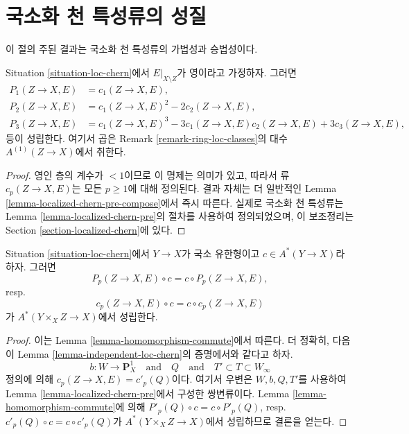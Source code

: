 \section{국소화 천 특성류의 성질}
\label{section-properties-loc-chern}

\noindent
이 절의 주된 결과는 국소화 천 특성류의 가법성과 승법성이다.

\begin{lemma}
\label{lemma-loc-chern-character}
Situation \ref{situation-loc-chern}에서 $E|_{X \setminus Z}$가 영이라고
가정하자. 그러면
\begin{align*}
P_1(Z \to X, E) & = c_1(Z \to X, E), \\
P_2(Z \to X, E) & = c_1(Z \to X, E)^2 - 2c_2(Z \to X, E), \\
P_3(Z \to X, E) & = c_1(Z \to X, E)^3 - 3c_1(Z \to X, E)c_2(Z \to X, E)
+ 3c_3(Z \to X, E),
\end{align*}
등이 성립한다. 여기서 곱은 Remark \ref{remark-ring-loc-classes}의
대수 $A^{(1)}(Z \to X)$에서 취한다.
\end{lemma}

\begin{proof}
영인 층의 계수가 $< 1$이므로 이 명제는 의미가 있고, 따라서
류 $c_p(Z \to X, E)$는 모든 $p \geq 1$에 대해 정의된다.
결과 자체는 더 일반적인 Lemma
\ref{lemma-localized-chern-pre-compose}에서 즉시 따른다. 실제로
국소화 천 특성류는 Lemma \ref{lemma-localized-chern-pre}의 절차를
사용하여 정의되었으며, 이 보조정리는 Section
\ref{section-localized-chern}에 있다.
\end{proof}

\begin{lemma}
\label{lemma-loc-chern-classes-commute}
Situation \ref{situation-loc-chern}에서 $Y \to X$가 국소 유한형이고
$c \in A^*(Y \to X)$라 하자. 그러면
$$
P_p(Z \to X, E) \circ c = c \circ P_p(Z \to X, E),
$$
resp.\
$$
c_p(Z \to X, E) \circ c = c \circ c_p(Z \to X, E)
$$
가 $A^*(Y \times_X Z \to X)$에서 성립한다.
\end{lemma}

\begin{proof}
이는 Lemma \ref{lemma-homomorphism-commute}에서 따른다.
더 정확히, 다음이 Lemma \ref{lemma-independent-loc-chern}의 증명에서와
같다고 하자.
$$
b : W \to \mathbf{P}^1_X
\quad\text{and}\quad
Q
\quad\text{and}\quad
T' \subset T \subset W_\infty
$$
정의에 의해 $c_p(Z \to X, E) = c'_p(Q)$이다. 여기서 우변은
$W, b, Q, T'$를 사용하여 Lemma \ref{lemma-localized-chern-pre}에서
구성한 쌍변류이다. Lemma \ref{lemma-homomorphism-commute}에 의해
$P'_p(Q) \circ c = c \circ P'_p(Q)$, resp.\ $c'_p(Q) \circ c = c \circ c'_p(Q)$가
$A^*(Y \times_X Z \to X)$에서 성립하므로 결론을 얻는다.
\end{proof}

